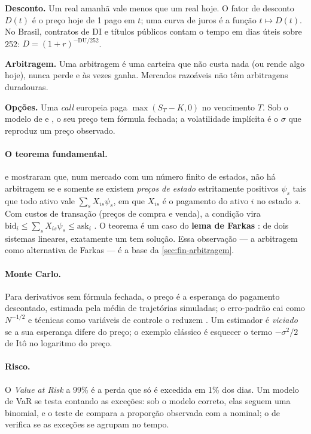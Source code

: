 \begin{graduacao}
\textbf{Desconto.} Um real amanhã vale menos que um real hoje. O fator de desconto $D(t)$ é o preço hoje de 1 pago em $t$; uma curva de juros é a função $t \mapsto D(t)$. No Brasil, contratos de DI e títulos públicos contam o tempo em dias úteis sobre 252: $D = (1+r)^{-\mathrm{DU}/252}$.

\textbf{Arbitragem.} Uma arbitragem é uma carteira que não custa nada (ou rende algo hoje), nunca perde e às vezes ganha. Mercados razoáveis não têm arbitragens duradouras.

\textbf{Opções.} Uma \textit{call} europeia paga $\max(S_T - K, 0)$ no vencimento $T$. Sob o modelo de  e , o seu preço tem fórmula fechada; a volatilidade implícita é o $\sigma$ que reproduz um preço observado.
\end{graduacao}

\paragraph{O teorema fundamental.}  e  mostraram que, num mercado com um número finito de estados, não há arbitragem se e somente se existem \emph{preços de estado} estritamente positivos $\psi_s$ tais que todo ativo vale $\sum_s X_{is} \psi_s$, em que $X_{is}$ é o pagamento do ativo $i$ no estado $s$. Com custos de transação (preços de compra e venda), a condição vira $\mathrm{bid}_i \leq \sum_s X_{is}\psi_s \leq \mathrm{ask}_i$ \cite{jouini1995}. O teorema é um caso do \textbf{lema de Farkas} \cite{farkas1902}: de dois sistemas lineares, exatamente um tem solução. Essa observação --- a arbitragem como alternativa de Farkas --- é a base da \autoref{sec:fin-arbitragem}.

\paragraph{Monte Carlo.} Para derivativos sem fórmula fechada, o preço é a esperança do pagamento descontado, estimada pela média de trajetórias simuladas; o erro-padrão cai como $N^{-1/2}$ e técnicas como variáveis de controle o reduzem \cite{glasserman2003}. Um estimador é \emph{viciado} se a sua esperança difere do preço; o exemplo clássico é esquecer o termo $-\sigma^2/2$ de Itô no logaritmo do preço.

\paragraph{Risco.} O \textit{Value at Risk} a 99\% é a perda que só é excedida em 1\% dos dias. Um modelo de VaR se testa contando as exceções: sob o modelo correto, elas seguem uma binomial, e o teste de  compara a proporção observada com a nominal; o de  verifica se as exceções se agrupam no tempo.

